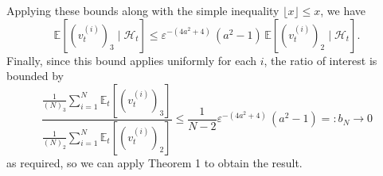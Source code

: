 \documentclass[fleqn]{article}
\theoremstyle{definition}
\newcommand{\E}{\mathbb{E}}
\newcommand{\1}[1]{\mathbbm{1}_{\{#1\}}}
\newcommand{\vt}[2][t]{v_{#1}^{(#2)}}
\begin{document}
Applying these bounds along with the simple inequality $\lfloor x\rfloor \leq x$, we have
\begin{equation*}
\E[(\vt{i})_3 \mid \mathcal{H}_t] \leq \varepsilon^{-(4 a^2 +4)}\, (a^2 -1 )\,\E[(\vt{i})_2 \mid \mathcal{H}_t] .
\end{equation*}
Finally, since this bound applies uniformly for each $i$, the ratio of interest is bounded by
\begin{equation*}
\frac{\frac{1}{(N)_3} \sum_{i=1}^N \E_t[(\vt{i})_3]}{\frac{1}{(N)_2} \sum_{i=1}^N \E_t[(\vt{i})_2]}
\leq \frac{1}{N-2} \varepsilon^{-(4 a^2 +4)}\, (a^2 -1 ) =: b_N \to 0
\end{equation*}
as required, so we can apply Theorem 1 to obtain the result.


\end{document}
